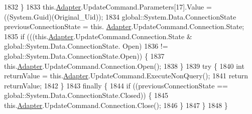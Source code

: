 \begin{DoxyCode}
1832             \}
1833             this.\hyperlink{class_proyecto___integrador__3_1_1ds_usuarios_table_adapters_1_1_usuarios_table_adapter_a46252bad9dadbf20130beca25d50b5bc}{Adapter}.UpdateCommand.Parameters[17].Value = ((System.Guid)(Original\_Uid));
1834             global::System.Data.ConnectionState previousConnectionState = this.
      \hyperlink{class_proyecto___integrador__3_1_1ds_usuarios_table_adapters_1_1_usuarios_table_adapter_a46252bad9dadbf20130beca25d50b5bc}{Adapter}.UpdateCommand.Connection.State;
1835             \textcolor{keywordflow}{if} (((this.\hyperlink{class_proyecto___integrador__3_1_1ds_usuarios_table_adapters_1_1_usuarios_table_adapter_a46252bad9dadbf20130beca25d50b5bc}{Adapter}.UpdateCommand.Connection.State & global::System.Data.ConnectionState.
      Open) 
1836                         != global::System.Data.ConnectionState.Open)) \{
1837                 this.\hyperlink{class_proyecto___integrador__3_1_1ds_usuarios_table_adapters_1_1_usuarios_table_adapter_a46252bad9dadbf20130beca25d50b5bc}{Adapter}.UpdateCommand.Connection.Open();
1838             \}
1839             \textcolor{keywordflow}{try} \{
1840                 \textcolor{keywordtype}{int} returnValue = this.\hyperlink{class_proyecto___integrador__3_1_1ds_usuarios_table_adapters_1_1_usuarios_table_adapter_a46252bad9dadbf20130beca25d50b5bc}{Adapter}.UpdateCommand.ExecuteNonQuery();
1841                 \textcolor{keywordflow}{return} returnValue;
1842             \}
1843             \textcolor{keywordflow}{finally} \{
1844                 \textcolor{keywordflow}{if} ((previousConnectionState == global::System.Data.ConnectionState.Closed)) \{
1845                     this.\hyperlink{class_proyecto___integrador__3_1_1ds_usuarios_table_adapters_1_1_usuarios_table_adapter_a46252bad9dadbf20130beca25d50b5bc}{Adapter}.UpdateCommand.Connection.Close();
1846                 \}
1847             \}
1848         \}
\end{DoxyCode}
